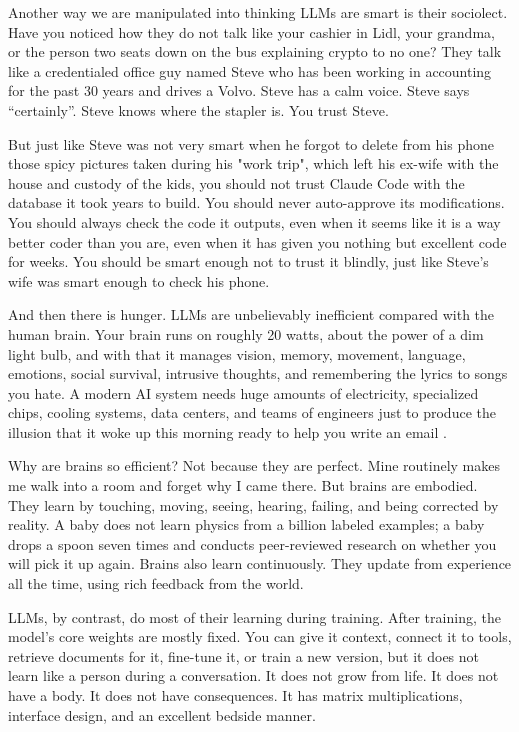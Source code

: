 \documentclass[12pt,oneside]{book}
\begin{document}
Another way we are manipulated into thinking LLMs are smart is their sociolect. Have you noticed how they do not talk like your cashier in Lidl, your grandma, or the person two seats down on the bus explaining crypto to no one? They talk like a credentialed office guy named Steve who has been working in accounting for the past 30 years and drives a Volvo. Steve has a calm voice. Steve says ``certainly''. Steve knows where the stapler is. You trust Steve.

But just like Steve was not very smart when he forgot to delete from his phone those spicy pictures taken during his "work trip", which left his ex-wife with the house and custody of the kids, you should not trust Claude Code with the database it took years to build. You should never auto-approve its modifications. You should always check the code it outputs, even when it seems like it is a way better coder than you are, even when it has given you nothing but excellent code for weeks. You should be smart enough not to trust it blindly, just like Steve's wife was smart enough to check his phone.

And then there is hunger. LLMs are unbelievably inefficient compared with the human brain. Your brain runs on roughly 20 watts, about the power of a dim light bulb, and with that it manages vision, memory, movement, language, emotions, social survival, intrusive thoughts, and remembering the lyrics to songs you hate. A modern AI system needs huge amounts of electricity, specialized chips, cooling systems, data centers, and teams of engineers just to produce the illusion that it woke up this morning ready to help you write an email \parencite{strubell2019,patterson2021}.

Why are brains so efficient? Not because they are perfect. Mine routinely makes me walk into a room and forget why I came there. But brains are embodied. They learn by touching, moving, seeing, hearing, failing, and being corrected by reality. A baby does not learn physics from a billion labeled examples; a baby drops a spoon seven times and conducts peer-reviewed research on whether you will pick it up again. Brains also learn continuously. They update from experience all the time, using rich feedback from the world.

LLMs, by contrast, do most of their learning during training. After training, the model's core weights are mostly fixed. You can give it context, connect it to tools, retrieve documents for it, fine-tune it, or train a new version, but it does not learn like a person during a conversation. It does not grow from life. It does not have a body. It does not have consequences. It has matrix multiplications, interface design, and an excellent bedside manner.
\end{document}
